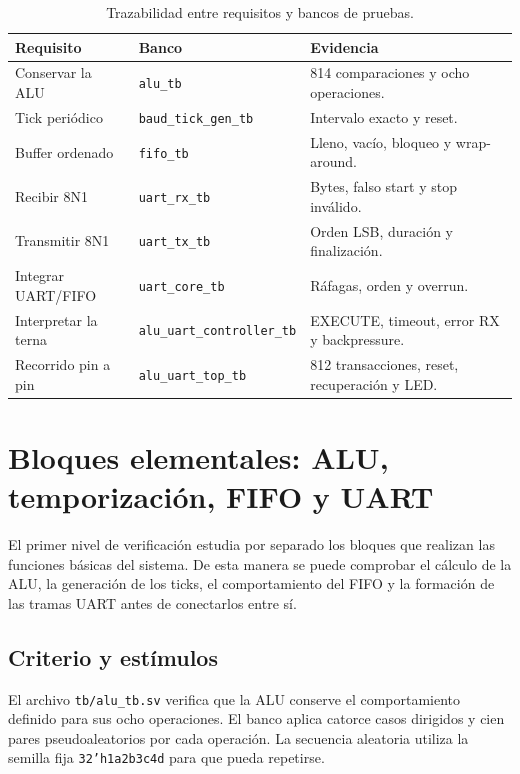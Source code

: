 \begin{table}[H]
  \centering
  \small
  \begin{tabularx}{\textwidth}{L{3.3cm}L{3.8cm}Y}
    \toprule
    \textbf{Requisito} & \textbf{Banco} & \textbf{Evidencia} \\
    \midrule
    Conservar la ALU & \texttt{alu\_tb} & 814 comparaciones y ocho
    operaciones. \\
    Tick periódico & \texttt{baud\_tick\_gen\_tb} & Intervalo exacto y reset. \\
    Buffer ordenado & \texttt{fifo\_tb} & Lleno, vacío, bloqueo y
    wrap-around. \\
    Recibir 8N1 & \texttt{uart\_rx\_tb} & Bytes, falso start y stop inválido. \\
    Transmitir 8N1 & \texttt{uart\_tx\_tb} & Orden LSB, duración y
    finalización. \\
    Integrar UART/FIFO & \texttt{uart\_core\_tb} & Ráfagas, orden y overrun. \\
    Interpretar la terna & \texttt{alu\_uart\_}\newline\texttt{controller\_tb} &
    EXECUTE, timeout, error RX y backpressure. \\
    Recorrido pin a pin & \texttt{alu\_uart\_top\_tb} &
    812 transacciones, reset, recuperación y LED. \\
    \bottomrule
  \end{tabularx}
  \caption{Trazabilidad entre requisitos y bancos de pruebas.}%
  \label{tab:trazabilidad}
\end{table}

\section{Bloques elementales: ALU, temporización, FIFO y UART}

El primer nivel de verificación estudia por separado los bloques que
realizan las funciones básicas del sistema. De esta manera se puede
comprobar el cálculo de la ALU, la generación de los ticks, el
comportamiento del FIFO y la formación de las tramas UART antes de
conectarlos entre sí.

\subsection{Criterio y estímulos}

El archivo \texttt{tb/alu\_tb.sv} verifica que la ALU conserve el
comportamiento definido para sus ocho operaciones. El banco aplica
catorce casos dirigidos y cien pares pseudoaleatorios por cada
operación. La secuencia aleatoria utiliza la semilla fija
\texttt{32'h1a2b3c4d} para que pueda repetirse.

